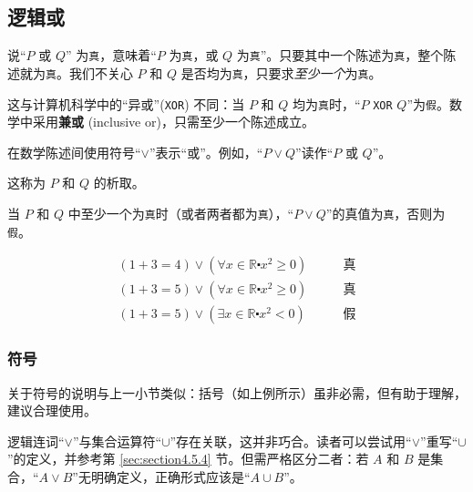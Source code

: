 \subsection{逻辑或}

说``$P$ 或 $Q$'' 为\verb|真|，意味着``$P$ 为\verb|真|，或 $Q$ 为\verb|真|''。只要其中一个陈述为\verb|真|，整个陈述就为\verb|真|。我们不关心 $P$ 和 $Q$ 是否均为\verb|真|，只要求\emph{至少一个}为\verb|真|。

这与计算机科学中的``异或''(\verb|XOR|) 不同：当 $P$ 和 $Q$ 均为\verb|真|时，``$P$ \verb|XOR| $Q$''为\verb|假|。数学中采用\textbf{兼或} (inclusive or)，只需至少一个陈述成立。

\begin{definition}
    在数学陈述间使用符号``$\lor$''表示``或''。例如，``$P \lor Q$''读作``$P$ 或 $Q$''。

    这称为 $P$ 和 $Q$ 的析取。
    
    当 $P$ 和 $Q$ 中至少一个为\verb|真|时（或者两者都为\verb|真|），``$P \lor Q$''的真值为\verb|真|，否则为\verb|假|。
\end{definition}

\begin{example}
    \begin{align*}
        (1 + 3 = 4) \lor (\forall x \in \mathbb{R} \centerdot x^2 \ge 0) \qquad &\text{真} \\
        (1 + 3 = 5) \lor (\forall x \in \mathbb{R} \centerdot x^2 \ge 0) \qquad &\text{真} \\
        (1 + 3 = 5) \lor (\exists x \in \mathbb{R} \centerdot x^2 < 0)   \qquad &\text{假}
    \end{align*}
\end{example}

\subsubsection*{符号}

关于符号的说明与上一小节类似：括号（如上例所示）虽非必需，但有助于理解，建议合理使用。

逻辑连词``$\lor$''与集合运算符``$\cup$''存在关联，这并非巧合。读者可以尝试用``$\lor$''重写``$\cup$''的定义，并参考第 \ref{sec:section4.5.4} 节。但需严格区分二者：若 $A$ 和 $B$ 是集合，``$A \lor B$''无明确定义，正确形式应该是``$A \cup B$''。
